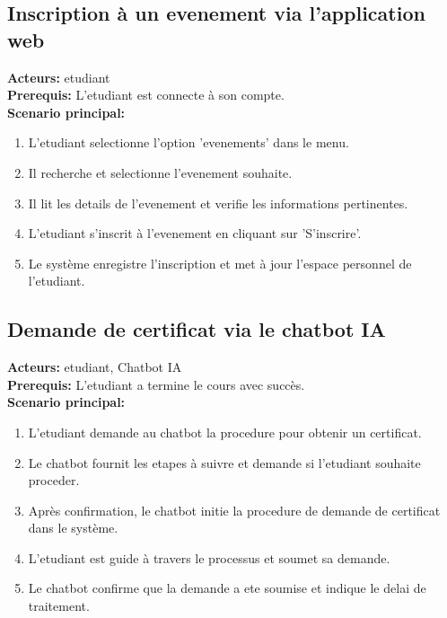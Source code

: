 \documentclass[a4paper, 11pt, openany]{report}
\begin{document}
\subsection{Inscription à un evenement via l'application web}
\textbf{Acteurs:} etudiant \\
\textbf{Prerequis:} L'etudiant est connecte à son compte. \\
\textbf{Scenario principal:}
\begin{enumerate}
    \item L'etudiant selectionne l'option 'evenements' dans le menu.
    \item Il recherche et selectionne l'evenement souhaite.
    \item Il lit les details de l'evenement et verifie les informations pertinentes.
    \item L'etudiant s'inscrit à l'evenement en cliquant sur 'S'inscrire'.
    \item Le système enregistre l'inscription et met à jour l'espace personnel de l'etudiant.
\end{enumerate}

\subsection{Demande de certificat via le chatbot IA}
\textbf{Acteurs:} etudiant, Chatbot IA \\
\textbf{Prerequis:} L'etudiant a termine le cours avec succès. \\
\textbf{Scenario principal:}
\begin{enumerate}
    \item L'etudiant demande au chatbot la procedure pour obtenir un certificat.
    \item Le chatbot fournit les etapes à suivre et demande si l'etudiant souhaite proceder.
    \item Après confirmation, le chatbot initie la procedure de demande de certificat dans le système.
    \item L'etudiant est guide à travers le processus et soumet sa demande.
    \item Le chatbot confirme que la demande a ete soumise et indique le delai de traitement.
\end{enumerate}
\end{document}
